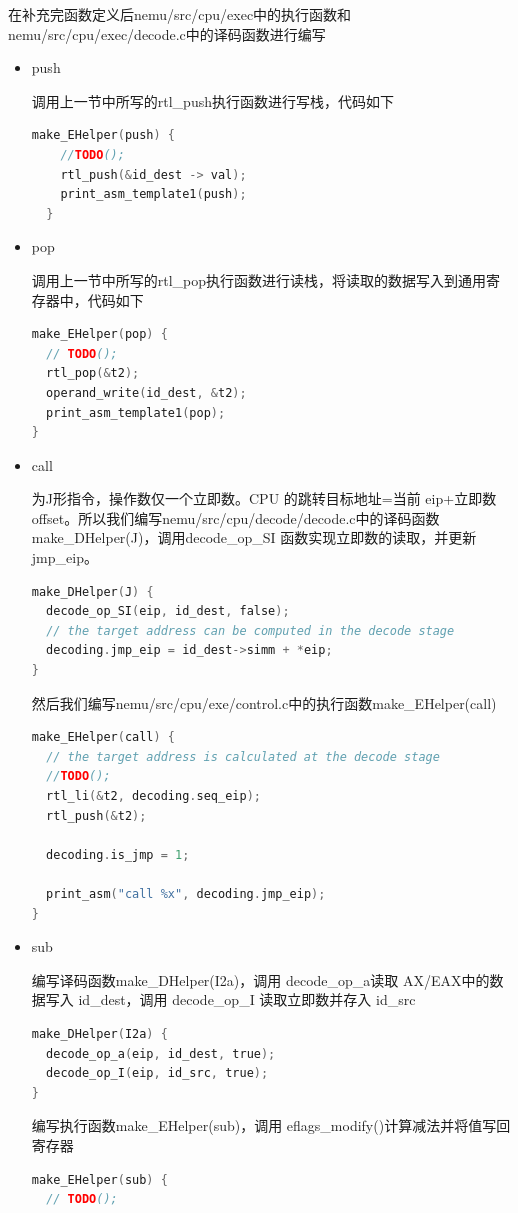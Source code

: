 \documentclass[UTF8,a4paper,10pt]{ctexart}
\begin{document}
在补充完函数定义后nemu/src/cpu/exec中的执行函数和nemu/src/cpu/exec/decode.c中的译码函数进行编写
\begin{itemize}
  \item push
  
  调用上一节中所写的rtl\_push执行函数进行写栈，代码如下
  \begin{lstlisting}[language = C]
  make_EHelper(push) {
    //TODO();
    rtl_push(&id_dest -> val);
    print_asm_template1(push); 
  }
  \end{lstlisting}
  \item pop
  
  调用上一节中所写的rtl\_pop执行函数进行读栈，将读取的数据写入到通用寄存器中，代码如下
  \begin{lstlisting}[language = C]
make_EHelper(pop) {
  // TODO();
  rtl_pop(&t2);
  operand_write(id_dest, &t2);
  print_asm_template1(pop);
}
\end{lstlisting}
  
\item call
    
为J形指令，操作数仅一个立即数。CPU 的跳转目标地址=当前 eip+立即数 offset。所以我们编写nemu/src/cpu/decode/decode.c中的译码函数make\_DHelper(J)，调用decode\_op\_SI 函数实现立即数的读取，并更新jmp\_eip。
\begin{lstlisting}[language = C]
make_DHelper(J) {
  decode_op_SI(eip, id_dest, false);
  // the target address can be computed in the decode stage
  decoding.jmp_eip = id_dest->simm + *eip;
}  
\end{lstlisting}
然后我们编写nemu/src/cpu/exe/control.c中的执行函数make\_EHelper(call)
\begin{lstlisting}[language = C]
make_EHelper(call) {
  // the target address is calculated at the decode stage
  //TODO();
  rtl_li(&t2, decoding.seq_eip);
  rtl_push(&t2);

  decoding.is_jmp = 1;

  print_asm("call %x", decoding.jmp_eip);
}
\end{lstlisting}
  \item sub
  
  编写译码函数make\_DHelper(I2a)，调用 decode\_op\_a读取 AX/EAX中的数据写入 id\_dest，调用 decode\_op\_I 读取立即数并存入 id\_src
  \begin{lstlisting}[language = C]
make_DHelper(I2a) {
  decode_op_a(eip, id_dest, true);
  decode_op_I(eip, id_src, true);
}
\end{lstlisting}
  编写执行函数make\_EHelper(sub)，调用 eflags\_modify()计算减法并将值写回寄存器
  \begin{lstlisting}[language = C]
make_EHelper(sub) {
  // TODO();


\end{lstlisting}
\end{itemize}
\end{document}

